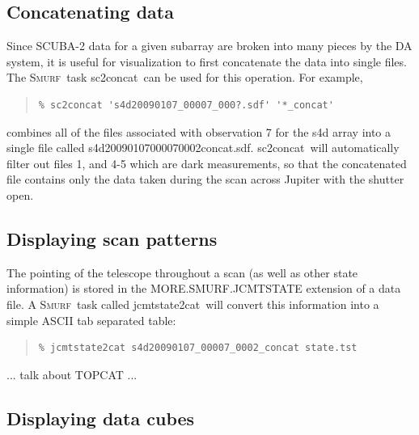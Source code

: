 \documentclass[twoside,11pt]{article}
\newenvironment{myquote}{\begin{quote}\begin{small}}{\end{small}\end{quote}}
\newcommand{\smurf}{\xref{\textsc{Smurf}}{sun258}{}}
\newcommand{\task}[1]{\textsf{#1}}
\newcommand{\concat}{\xref{\task{sc2concat}}{sun258}{SC2CONCAT}}
\newcommand{\jcmtstate}{\xref{\task{jcmtstate2cat}}{sun258}{JCMTSTATE2CAT}}
\newcommand{\xref}[3]{#1}
\newcommand{\xlabel}[1]{}
\renewcommand{\_}{\texttt{\symbol{95}}}
\begin{document}
\subsection{\xlabel{concat}Concatenating data} 

Since SCUBA-2 data for a given subarray are broken into many pieces by
the DA system, it is useful for visualization to first concatenate the
data into single files. The \smurf\ task \concat\ can be used for this
operation. For example,

\begin{myquote}
\begin{verbatim}
% sc2concat 's4d20090107_00007_000?.sdf' '*_concat' 
\end{verbatim}
\end{myquote}

combines all of the files associated with observation 7 for the s4d
array into a single file called
s4d20090107\_00007\_0002\_concat.sdf. \concat\ will automatically
filter out files 1, and 4-5 which are dark measurements, so that the
concatenated file contains only the data taken during the scan across
Jupiter with the shutter open.

\subsection{\xlabel{display_scan}Displaying scan patterns}

The pointing of the telescope throughout a scan (as well as other
state information) is stored in the MORE.SMURF.JCMTSTATE extension of
a data file. A \smurf\ task called \jcmtstate\ will convert this
information into a simple ASCII tab separated table:

\begin{myquote}
\begin{verbatim}
% jcmtstate2cat s4d20090107_00007_0002_concat state.tst
\end{verbatim}
\end{myquote}

... talk about TOPCAT ...

\subsection{\xlabel{display_cube}Displaying data cubes} 
\end{document}
